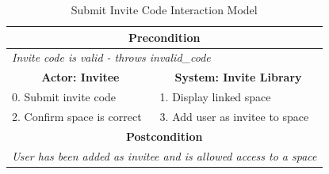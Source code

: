 \begin{table}[H]
\centering
\begin{tabular}{|l|l|}
\hline
\multicolumn{2}{|c|}{\textbf{Precondition}}                                    \\ \hline
\multicolumn{2}{|l|}{\textit{Invite code is valid - throws invalid\_code}}     \\ \hline
\multicolumn{1}{|c|}{\textbf{Actor: Invitee}} & \multicolumn{1}{c|}{\textbf{System: Invite Library}} \\ \hline
0. Submit invite code       & 1. Display linked space \\ \hline
2. Confirm space is correct & 3. Add user as invitee to space                  \\ \hline
\multicolumn{2}{|c|}{\textbf{Postcondition}}                                   \\ \hline
\multicolumn{2}{|l|}{\textit{User has been added as invitee and is allowed access to a space}}       \\ \hline
\end{tabular}
\caption{Submit Invite Code Interaction Model}
\label{tab:subkit_invite_interaction}
\end{table}
